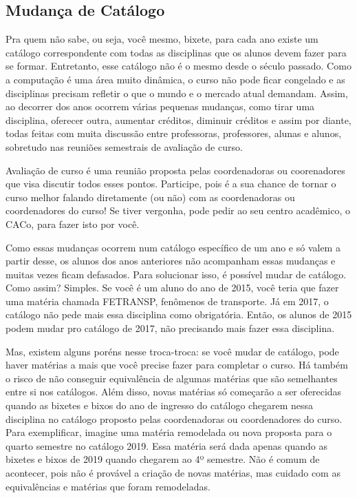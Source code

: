\subsection{Mudança de Catálogo}

Pra quem não sabe, ou seja, você mesmo, bixete, para cada ano existe um
catálogo correspondente com todas as disciplinas que os alunos devem fazer para
se formar. Entretanto, esse catálogo não é o mesmo desde o século passado. Como
a computação é uma área muito dinâmica, o curso não pode ficar congelado e as
disciplinas precisam refletir o que o mundo e o mercado atual demandam. Assim,
ao decorrer dos anos ocorrem várias pequenas mudanças, como tirar uma
disciplina, oferecer outra, aumentar créditos, diminuir créditos e assim por
diante, todas feitas com muita discussão entre professoras, professores, alunas
e alunos, sobretudo nas reuniões semestrais de avaliação de curso.

Avaliação de curso é uma reunião proposta pelas coordenadoras ou coorenadores
que visa discutir todos esses pontos. Participe, pois é a sua chance de tornar
o curso melhor falando diretamente (ou não) com as coordenadoras ou
coordenadores do curso! Se tiver vergonha, pode pedir ao seu centro acadêmico,
o CACo, para fazer isto por você.

Como essas mudanças ocorrem num catálogo específico de um ano e só valem a
partir desse, os alunos dos anos anteriores não acompanham essas mudanças e
muitas vezes ficam defasados. Para solucionar isso, é possível mudar de
catálogo. Como assim? Simples. Se você é um aluno do ano de 2015, você teria
que fazer uma matéria chamada FETRANSP, fenômenos de transporte. Já em 2017, o
catálogo não pede mais essa disciplina como obrigatória. Então, os alunos de
2015 podem mudar pro catálogo de 2017, não precisando mais fazer essa
disciplina.

Mas, existem alguns poréns nesse troca-troca: se você mudar de catálogo, pode
haver matérias a mais que você precise fazer para completar o curso. Há também
o risco de não conseguir equivalência de algumas matérias que são semelhantes
entre si nos catálogos. Além disso, novas matérias só começarão a ser
oferecidas quando as bixetes e bixos do ano de ingresso do catálogo chegarem
nessa disciplina no catálogo proposto pelas coordenadoras ou coordenadores do
curso. Para exemplificar, imagine uma matéria remodelada ou nova proposta para
o quarto semestre no catálogo 2019. Essa matéria será dada apenas quando as
bixetes e bixos de 2019 quando chegarem ao 4º semestre. Não é comum de
acontecer, pois não é provável a criação de novas matérias, mas cuidado com as
equivalências e matérias que foram remodeladas.

